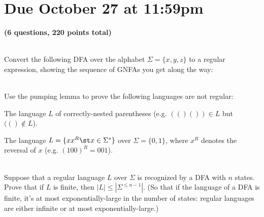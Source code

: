 \documentclass[11pt]{article}
\begin{document}
\maketitle

\section*{Due October 27 at 11:59pm}

\textbf{(6 questions, 220 points total)}

\begin{qunlist}

\\
Convert the following DFA over the alphabet $\Sigma = \{x,y,z\}$ to a regular expression, showing the sequence of GNFAs you get along the way:


\newpage

\\
Use the pumping lemma to prove the following languages are not regular:

\begin{qparts}
\item
The language $L$ of correctly-nested parentheses (e.g. $(()()) \in L$ but $(() \not \in L$).

\item
The language $L = \{ x x^R \st x \in \Sigma^*\}$ over $\Sigma = \{0, 1\}$, where $x^R$ denotes the reversal of $x$ (e.g. $(100)^R = 001$).
\end{qparts}

\newpage

\\
Suppose that a regular language $L$ over $\Sigma$ is recognized by a DFA with $n$ states.
Prove that if $L$ is finite, then $|L| \le |\Sigma^{\le n-1}|$.
(So that if the language of a DFA is finite, it's at most exponentially-large in the number of states: regular languages are either infinite or at most exponentially-large.)


\end{qunlist}
\end{document}
